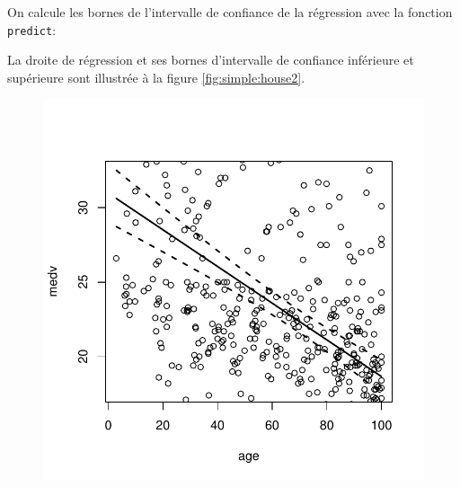 \begin{solution}{2.17}
\begin{enumerate}
      On calcule les bornes de l'intervalle de confiance de la
      régression avec la fonction \texttt{predict}:
\begin{knitrout}
\color{fgcolor}\begin{kframe}
\begin{alltt}
 \hlkwb{<-}   \hlstd{=} \hlstd{,}  \hlstd{=} \hlstd{)}
\end{alltt}
\end{kframe}
\end{knitrout}
      La droite de régression et ses bornes d'intervalle de confiance
      inférieure et supérieure sont illustrée à la figure
      \ref{fig:simple:house2}.
      \begin{figure}
        \centering
\begin{knitrout}
\color{fgcolor}\begin{kframe}
\begin{alltt}
 \hlkwb{<-} \hlopt{$}
 \hlopt{~}     \hlstd{=} 
\hlopt{$}
         \hlstd{=} \hlstd{,}  \hlstd{=} \hlstd{(}\hlstd{,} \hlstd{,} \hlstd{),} \hlstd{=} \hlstd{,}
         \hlstd{=} \hlstd{,}  \hlstd{=} \hlstd{)}
\end{alltt}
\end{kframe}

{\centering \includegraphics[width=.45\linewidth]{figure/fig-unnamed-chunk-22-1}

}




\end{knitrout}
\end{figure}
\end{enumerate}
\end{solution}

